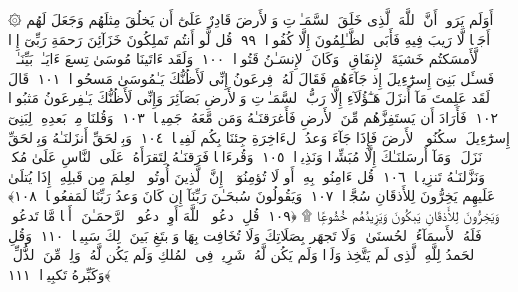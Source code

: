  ۞ أَوَلَم يَرَوا۟ أَنَّ ٱللَّهَ ٱلَّذِى خَلَقَ ٱلسَّمَـٰوَٟتِ وَٱلأَرضَ قَادِرٌ عَلَىٰٓ أَن يَخلُقَ مِثلَهُم وَجَعَلَ لَهُم أَجَلًۭا لَّا رَيبَ فِيهِ فَأَبَى ٱلظَّـٰلِمُونَ إِلَّا كُفُورًۭا ﴿٩٩﴾
 قُل لَّو أَنتُم تَملِكُونَ خَزَآئِنَ رَحمَةِ رَبِّىٓ إِذًۭا لَّأَمسَكتُم خَشيَةَ ٱلإِنفَاقِ ۚ وَكَانَ ٱلإِنسَـٰنُ قَتُورًۭا ﴿١٠٠﴾
 وَلَقَد ءَاتَينَا مُوسَىٰ تِسعَ ءَايَـٰتٍۭ بَيِّنَـٰتٍۢ ۖ فَسـَٔل بَنِىٓ إِسرَٰٓءِيلَ إِذ جَآءَهُم فَقَالَ لَهُۥ فِرعَونُ إِنِّى لَأَظُنُّكَ يَـٰمُوسَىٰ مَسحُورًۭا ﴿١٠١﴾
 قَالَ لَقَد عَلِمتَ مَآ أَنزَلَ هَـٰٓؤُلَآءِ إِلَّا رَبُّ ٱلسَّمَـٰوَٟتِ وَٱلأَرضِ بَصَآئِرَ وَإِنِّى لَأَظُنُّكَ يَـٰفِرعَونُ مَثبُورًۭا ﴿١٠٢﴾
 فَأَرَادَ أَن يَستَفِزَّهُم مِّنَ ٱلأَرضِ فَأَغرَقنَـٰهُ وَمَن مَّعَهُۥ جَمِيعًۭا ﴿١٠٣﴾
 وَقُلنَا مِنۢ بَعدِهِۦ لِبَنِىٓ إِسرَٰٓءِيلَ ٱسكُنُوا۟ ٱلأَرضَ فَإِذَا جَآءَ وَعدُ ٱلءَاخِرَةِ جِئنَا بِكُم لَفِيفًۭا ﴿١٠٤﴾
 وَبِٱلحَقِّ أَنزَلنَـٰهُ وَبِٱلحَقِّ نَزَلَ ۗ وَمَآ أَرسَلنَـٰكَ إِلَّا مُبَشِّرًۭا وَنَذِيرًۭا ﴿١٠٥﴾
 وَقُرءَانًۭا فَرَقنَـٰهُ لِتَقرَأَهُۥ عَلَى ٱلنَّاسِ عَلَىٰ مُكثٍۢ وَنَزَّلنَـٰهُ تَنزِيلًۭا ﴿١٠٦﴾
 قُل ءَامِنُوا۟ بِهِۦٓ أَو لَا تُؤمِنُوٓا۟ ۚ إِنَّ ٱلَّذِينَ أُوتُوا۟ ٱلعِلمَ مِن قَبلِهِۦٓ إِذَا يُتلَىٰ عَلَيهِم يَخِرُّونَ لِلأَذقَانِ سُجَّدًۭا ﴿١٠٧﴾
 وَيَقُولُونَ سُبحَـٰنَ رَبِّنَآ إِن كَانَ وَعدُ رَبِّنَا لَمَفعُولًۭا ﴿١٠٨﴾
 وَيَخِرُّونَ لِلأَذقَانِ يَبكُونَ وَيَزِيدُهُم خُشُوعًۭا ۩ ﴿١٠٩﴾
 قُلِ ٱدعُوا۟ ٱللَّهَ أَوِ ٱدعُوا۟ ٱلرَّحمَـٰنَ ۖ أَيًّۭا مَّا تَدعُوا۟ فَلَهُ ٱلأَسمَآءُ ٱلحُسنَىٰ ۚ وَلَا تَجهَر بِصَلَاتِكَ وَلَا تُخَافِت بِهَا وَٱبتَغِ بَينَ ذَٟلِكَ سَبِيلًۭا ﴿١١٠﴾
 وَقُلِ ٱلحَمدُ لِلَّهِ ٱلَّذِى لَم يَتَّخِذ وَلَدًۭا وَلَم يَكُن لَّهُۥ شَرِيكٌۭ فِى ٱلمُلكِ وَلَم يَكُن لَّهُۥ وَلِىٌّۭ مِّنَ ٱلذُّلِّ ۖ وَكَبِّرهُ تَكبِيرًۢا ﴿١١١﴾
 
